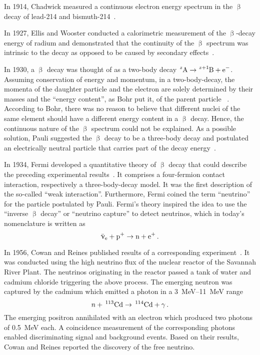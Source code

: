 In 1914, Chadwick measured a continuous electron energy spectrum in the $\upbeta$ decay of lead-214 and bismuth-214~\cite{Chadwick:1}. 

In 1927, Ellis and Wooster conducted a calorimetric measurement of the $\upbeta$-decay energy of radium and demonstrated that the continuity of the $\upbeta$ spectrum was intrinsic to the decay as opposed to be caused by secondary effects~\cite{Ellis:1}. 

In 1930, a $\upbeta$ decay was thought of as a two-body decay $\ce{^zA} \rightarrow \ce{^{z+1}B} + \ce{e^-}$. Assuming conservation of energy and momentum, in a two-body-decay, the momenta of the daughter particle  and the electron  are solely determined by their masses and the ``energy content'', as Bohr put it, of the parent particle ~\cite{Bohr:1}. According to Bohr, there was no reason to believe that different nuclei of the same element  should have a different energy content in a $\upbeta$ decay. Hence, the continuous nature of the $\upbeta$ spectrum could not be explained. As a possible solution, Pauli suggested the $\upbeta$ decay to be a three-body decay and postulated an electrically neutral particle that carries part of the decay energy~\cite{Pauli1930}. 

In 1934, Fermi developed a quantitative theory of $\upbeta$ decay that could describe the preceding experimental results~\cite{Fermi1934}. It comprises a four-fermion contact interaction, respectively a three-body-decay model. It was the first description of the so-called ``weak interaction''. Furthermore, Fermi coined the term ``neutrino'' for the particle postulated by Pauli. Fermi's theory inspired the idea to use the ``inverse $\upbeta$ decay'' or ``neutrino capture'' to detect neutrinos, which in today's nomenclature is written as
\begin{equation*}
    \aeneutrino + \ce{p^+} \rightarrow \ce{n} + \ce{e^+} \fullstop
\end{equation*}

In 1956, Cowan and Reines published results of a corresponding experiment~\cite{Cowan103}. It was conducted using the high neutrino flux of the nuclear reactor of the Savannah River Plant. The neutrinos originating in the reactor passed a tank of water and cadmium chloride triggering the above process. The emerging neutron was captured by the cadmium which emitted a photon in a \SIrange{3}{11}{MeV} range
\begin{equation*}
	n+\,^{113}\mathrm{Cd}\rightarrow \,^{114}\mathrm{Cd}+\gamma
	\text{\,.}
\end{equation*}
The emerging positron annihilated with an electron which produced two photons of \SI{0.5}{MeV} each. A coincidence measurement of the corresponding photons enabled discriminating signal and background events. Based on their results, Cowan and Reines reported the discovery of the free neutrino. 

